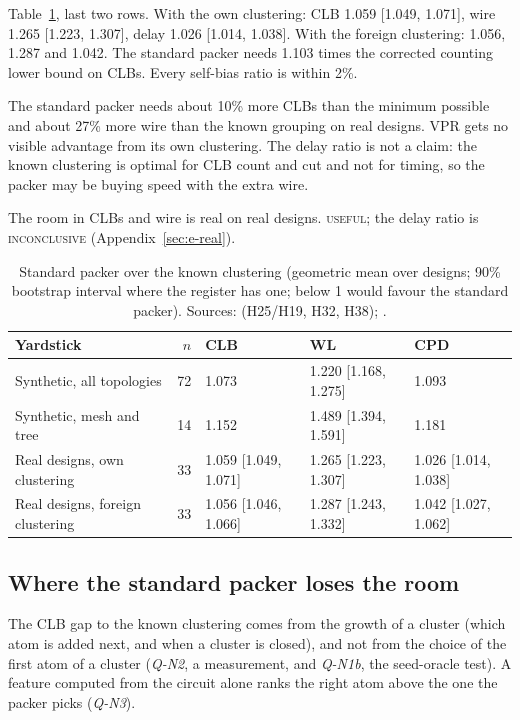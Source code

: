  Table~\ref{tab:room}, last two rows. With the own clustering: CLB 1.059 [1.049, 1.071], wire 1.265 [1.223, 1.307], delay 1.026 [1.014, 1.038]. With the foreign clustering: 1.056, 1.287 and 1.042. The standard packer needs 1.103 times the corrected counting lower bound on CLBs. Every self-bias ratio is within 2\%.

 The standard packer needs about 10\% more CLBs than the minimum possible and about 27\% more wire than the known grouping on real designs. VPR gets no visible advantage from its own clustering. The delay ratio is not a claim: the known clustering is optimal for CLB count and cut and not for timing, so the packer may be buying speed with the extra wire.

 The room in CLBs and wire is real on real designs. \textsc{useful}; the delay ratio is \textsc{inconclusive} (Appendix~\ref{sec:e-real}).

\begin{table}[t]
\caption{Standard packer over the known clustering (geometric mean over designs; 90\% bootstrap interval where the register has one; below 1 would favour the standard packer). Sources:  (H25/H19, H32, H38); .}
\label{tab:room}
\centering
\footnotesize\setlength{\tabcolsep}{3pt}
\begin{tabular}{@{}lrlll@{}}
\toprule
Yardstick & $n$ & CLB & WL & CPD \\
\midrule
Synthetic, all topologies & 72 & 1.073 & 1.220 [1.168, 1.275] & 1.093 \\
Synthetic, mesh and tree & 14 & 1.152 & 1.489 [1.394, 1.591] & 1.181 \\
Real designs, own clustering & 33 & 1.059 [1.049, 1.071] & 1.265 [1.223, 1.307] & 1.026 [1.014, 1.038] \\
Real designs, foreign clustering & 33 & 1.056 [1.046, 1.066] & 1.287 [1.243, 1.332] & 1.042 [1.027, 1.062] \\
\bottomrule
\end{tabular}
\end{table}

\subsection{Where the standard packer loses the room}
\label{sec:r-loses}

 The CLB gap to the known clustering comes from the growth of a cluster (which atom is added next, and when a cluster is closed), and not from the choice of the first atom of a cluster (\emph{Q-N2}, a measurement, and \emph{Q-N1b}, the seed-oracle test). A feature computed from the circuit alone ranks the right atom above the one the packer picks (\emph{Q-N3}).

